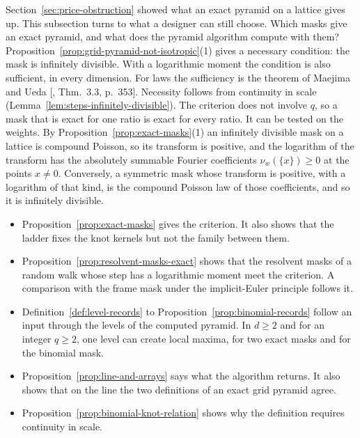 Section~\ref{sec:price-obstruction} showed what an exact pyramid on a lattice gives up. This
subsection turns to what a designer can still choose. Which masks give an exact pyramid, and what
does the pyramid algorithm compute with them? Proposition~\ref{prop:grid-pyramid-not-isotropic}(1)
gives a necessary condition: the mask is infinitely divisible. With a logarithmic moment the
condition is also sufficient, in every dimension. For laws the sufficiency is the theorem of
Maejima and Ueda [, Thm.~3.3, p.~353]. Necessity follows from
continuity in scale (Lemma~\ref{lem:steps-infinitely-divisible}). The criterion does not involve
$q$, so a mask that is exact for one ratio is exact for every ratio. It can be tested on the
weights. By Proposition~\ref{prop:exact-masks}(1) an infinitely divisible mask on a lattice is
compound Poisson, so its transform is positive, and the logarithm of the transform has the absolutely
summable Fourier coefficients $\nu_w(\{x\}) \ge 0$ at the points $x \ne 0$. Conversely, a symmetric
mask whose transform is positive, with a logarithm of that kind, is the compound Poisson law of
those coefficients, and so it is infinitely divisible.
\begin{itemize}
\item Proposition~\ref{prop:exact-masks} gives the criterion. It also shows that the ladder fixes
the knot kernels but not the family between them.
\item Proposition~\ref{prop:resolvent-masks-exact} shows that the resolvent masks of a random walk
whose step has a logarithmic moment meet the criterion. A comparison with the frame mask under the
implicit-Euler principle follows it.
\item Definition~\ref{def:level-records} to Proposition~\ref{prop:binomial-records} follow an
input through the levels of the computed pyramid. In $d \ge 2$ and for an integer $q \ge 2$, one
level can create local maxima, for two exact masks and for the binomial mask.
\item Proposition~\ref{prop:line-and-arrays} says what the algorithm returns. It also shows that on
the line the two definitions of an exact grid pyramid agree.
\item Proposition~\ref{prop:binomial-knot-relation} shows why the definition requires continuity in
scale.
\end{itemize}


